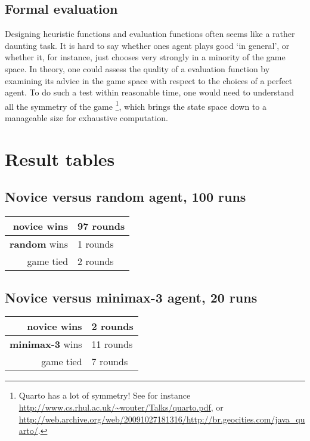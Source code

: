 \documentclass[a4paper,9pt]{article}
\begin{document}
\subsection{Formal evaluation}
Designing heuristic functions and evaluation functions often seems like a
rather daunting task. It is hard to say whether ones agent plays good `in
general', or whether it, for instance, just chooses very strongly in a minority
of the game space. In theory, one could assess the quality of a evaluation function
by examining its advice in the game space with respect to the choices of a perfect
agent. To do such a test within reasonable time, one would need to understand
all the symmetry of the game \footnote{Quarto has a lot
of symmetry! See for instance
\url{http://www.cs.rhul.ac.uk/~wouter/Talks/quarto.pdf}, or
\url{http://web.archive.org/web/20091027181316/http://br.geocities.com/java_quarto/}.},
which brings the state space down to a manageable size for exhaustive
computation.

\section{Result tables}

\vspace{10pt}
\subsection{Novice versus random agent, 100 runs}
{ \Large
\begin{tabular}{r|l}
  \textbf{novice} \textsf{wins} & 97 \textsf{rounds} \\
  \hline
  \textbf{random} \textsf{wins} & 1 \textsf{rounds} \\
  \hline
  \textsf{game tied}            & 2 \textsf{rounds} \\
\end{tabular}
}

\vspace{10pt}
\subsection{Novice versus minimax-3 agent, 20 runs}
{ \Large
\begin{tabular}{r|l}
  \textbf{novice} \textsf{wins} & 2 \textsf{rounds} \\
  \hline
  \textbf{minimax-3} \textsf{wins} & 11 \textsf{rounds} \\
  \hline
  \textsf{game tied}            & 7 \textsf{rounds} \\
\end{tabular}
}
\end{document}
